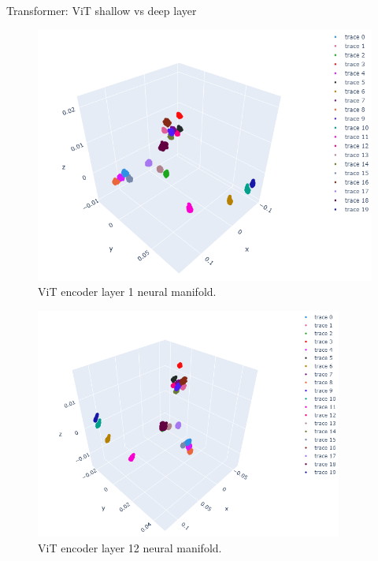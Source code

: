 \documentclass[xcolor={dvipsnames,svgnames}]{beamer}
\begin{document}
\begin{frame}{Transformer: ViT shallow vs deep layer}
    \begin{minipage}[t]{.45\linewidth}  
    \begin{figure}
            \includegraphics[width=\textwidth]{presentation/embeddings/vit-2d-layer1.png}
             \caption{ViT encoder layer 1 neural manifold.}
        \end{figure} 
    \end{minipage}
      \begin{minipage}[t]{.45\linewidth}   
      \begin{figure}         \includegraphics[width=0.9\textwidth]{presentation/embeddings/vit-2d-layer12.png}
       \caption{ViT encoder layer 12 neural manifold.}
            \end{figure} 
    \end{minipage}
\end{frame}
\end{document}
